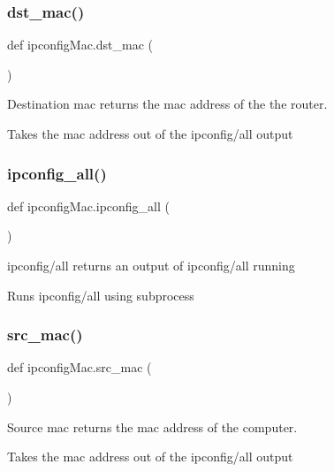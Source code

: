\subsubsection{\texorpdfstring{dst\+\_\+mac()}{dst\_mac()}}
{\footnotesize\ttfamily def ipconfig\+Mac.\+dst\+\_\+mac (\begin{DoxyParamCaption}{ }\end{DoxyParamCaption})}



Destination mac returns the mac address of the the router. 

Takes the mac address out of the ipconfig/all output \mbox{\label{namespaceipconfig_mac_a349e0c4208e32fe64e1d3b4f2633bb12}} 
\subsubsection{\texorpdfstring{ipconfig\+\_\+all()}{ipconfig\_all()}}
{\footnotesize\ttfamily def ipconfig\+Mac.\+ipconfig\+\_\+all (\begin{DoxyParamCaption}{ }\end{DoxyParamCaption})}



ipconfig/all returns an output of ipconfig/all running 

Runs ipconfig/all using subprocess \mbox{\label{namespaceipconfig_mac_a56db04e8b9762a479f6e83b3b1332deb}} 
\subsubsection{\texorpdfstring{src\+\_\+mac()}{src\_mac()}}
{\footnotesize\ttfamily def ipconfig\+Mac.\+src\+\_\+mac (\begin{DoxyParamCaption}{ }\end{DoxyParamCaption})}



Source mac returns the mac address of the computer. 

Takes the mac address out of the ipconfig/all output 